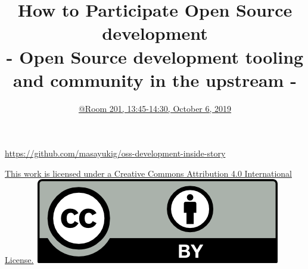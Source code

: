 \documentclass[aspectratio=169,11pt,hyperref={colorlinks=true}]{beamer}
\author[Masayuki Igawa]{%
    \texorpdfstring{%
        \begin{columns}
        \column{.7\linewidth}
            \centering
            Masayuki Igawa: \href{mailto:masayuki@igawa.io}{masayuki@igawa.io}\\
            \texttt{masayukig on
              \href{https://freenode.net/}{Freenode},
              \href{https://github.com/masayukig}{GitHub},
              \href{https://twitter.com/masayukig}{Twitter},
              \href{https://www.linkedin.com/in/masayukig/}{LinkedIn}}
        \end{columns}
        }
    {Masayuki Igawa}
}
\date{\href{https://events.opensuse.org/conferences/summitasia19/program/proposals/2762}{@Room 201, 13:45-14:30, October 6, 2019}}
\title[oss-development-inside-story
  \hspace{4em}\insertframenumber/\inserttotalframenumber]{How to Participate Open Source development\\
  - Open Source development tooling and community in the upstream -}
\begin{document}
{%
\begin{frame}[noframenumbering]
  \hypersetup{colorlinks,urlcolor=susedark}
  \titlepage{}
  \centering
  \@place \par
  \href{https://github.com/masayukig/oss-development-inside-story}{https://github.com/masayukig/oss-development-inside-story}
  \begin{flushright}
    \tiny\href{https://creativecommons.org/licenses/by/4.0/}{This work
      is licensed under a Creative Commons Attribution 4.0
      International License.}~\includegraphics[scale=0.3]{images/cc_by.png}
  \end{flushright}
\end{frame}
}
\end{document}
